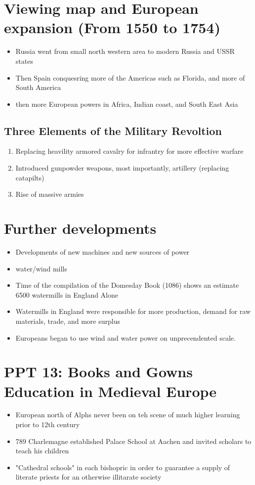 \documentclass{article}
\begin{document}
\section*{Viewing map and European expansion (From 1550 to 1754)}
\begin{itemize}
  \item Russia went from small north western area to modern Russia and USSR states
  \item Then Spain conquesring more of the Americas such as Florida, and more of South America
  \item then more European powers in Africa, Indian coast, and South East Asia
\end{itemize}

\subsection{Three Elements of the Military Revoltion}
\begin{enumerate}
  \item Replacing heavility armored cavalry
    for infrantry for more effective warfare
  \item Introduced gunpowder weapons, most importantly, artillery (replacing catapilts)
  \item Rise of massive armies
\end{enumerate}

\section*{Further developments}
\begin{itemize}
  \item Developments of new machines and new sources of power
  \item water/wind mills
  \item Time of the compilation of the Domesday Book (1086) shows an estimate 6500 watermills
    in England Alone
  \item Watermills in England were responsible for more production,
    demand for raw materials, trade, and more surplus
  \item Europeans began to use wind and water
    power on unprecendented scale.
\end{itemize}

\newpage

\section{PPT 13: Books and Gowns\\ Education in Medieval Europe}
\begin{itemize}
  \item European north of Alphs never been on teh scene of much
    higher learning prior to 12th century
  \item 789 Charlemagne established Palace School at Aachen
    and invited scholars to teach his children
  \item "Cathedral schools" in each bishopric in order to guarantee a supply
    of literate priests for an otherwise illitarate society
\end{itemize}
\end{document}
